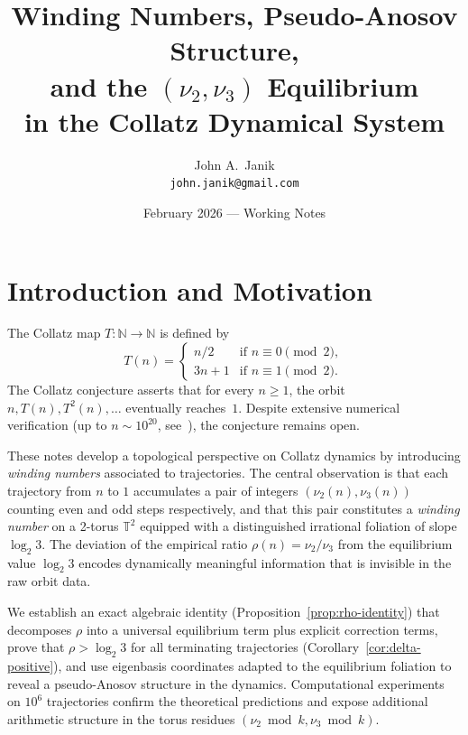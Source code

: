 \documentclass[11pt,a4paper]{article}
\title{\textbf{Winding Numbers, Pseudo-Anosov Structure,\\
and the $(\nu_2, \nu_3)$ Equilibrium\\
in the Collatz Dynamical System}}
\author{John A.\ Janik\\
\texttt{john.janik@gmail.com}}
\date{February 2026 — Working Notes}
\newcommand{\N}{\mathbb{N}}
\newcommand{\T}{\mathbb{T}}
\theoremstyle{plain}
\theoremstyle{definition}
\begin{document}
\maketitle

\tableofcontents
\newpage

\section{Introduction and Motivation}

The Collatz map $T: \N \to \N$ is defined by
\begin{equation}\label{eq:collatz-map}
    T(n) = \begin{cases}
        n/2 & \text{if } n \equiv 0 \pmod{2},\\
        3n + 1 & \text{if } n \equiv 1 \pmod{2}.
    \end{cases}
\end{equation}
The Collatz conjecture asserts that for every $n \geq 1$, the orbit $n, T(n), T^2(n), \ldots$ eventually reaches~$1$. Despite extensive numerical verification (up to $n \sim 10^{20}$, see~\cite{Oliveira2015}), the conjecture remains open.

These notes develop a topological perspective on Collatz dynamics by introducing \emph{winding numbers} associated to trajectories. The central observation is that each trajectory from $n$ to $1$ accumulates a pair of integers $(\nu_2(n), \nu_3(n))$ counting even and odd steps respectively, and that this pair constitutes a \emph{winding number} on a 2-torus $\T^2$ equipped with a distinguished irrational foliation of slope $\log_2 3$. The deviation of the empirical ratio $\rho(n) = \nu_2/\nu_3$ from the equilibrium value $\log_2 3$ encodes dynamically meaningful information that is invisible in the raw orbit data.

We establish an exact algebraic identity (Proposition~\ref{prop:rho-identity}) that decomposes $\rho$ into a universal equilibrium term plus explicit correction terms, prove that $\rho > \log_2 3$ for all terminating trajectories (Corollary~\ref{cor:delta-positive}), and use eigenbasis coordinates adapted to the equilibrium foliation to reveal a pseudo-Anosov structure in the dynamics. Computational experiments on $10^6$ trajectories confirm the theoretical predictions and expose additional arithmetic structure in the torus residues $(\nu_2 \bmod k, \nu_3 \bmod k)$.
\end{document}
